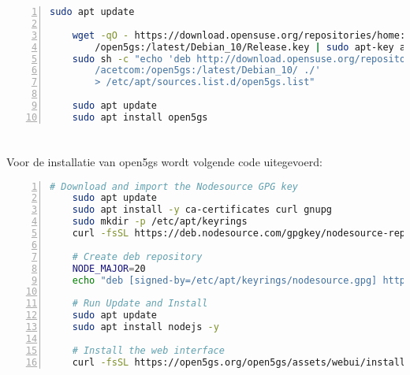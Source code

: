 
\begin{lstlisting}[basicstyle=\small, frame=single, breaklines=true, postbreak=\mbox{\textcolor{red}{$\hookrightarrow$}\space}, escapeinside ={\%,}, escapechar={!}, numbers=left, language=sh, caption=Installatie van Open5GS]
    sudo apt update

    wget -qO - https://download.opensuse.org/repositories/home:/acetcom:
        /open5gs:/latest/Debian_10/Release.key | sudo apt-key add -
    sudo sh -c "echo 'deb http://download.opensuse.org/repositories/home:
        /acetcom:/open5gs:/latest/Debian_10/ ./' 
        > /etc/apt/sources.list.d/open5gs.list"
    
    sudo apt update
    sudo apt install open5gs
\end{lstlisting}

\section{}

Voor de installatie van \gls{open5gs} wordt volgende code uitegevoerd:

\begin{lstlisting}[basicstyle=\small, frame=single, breaklines=true, postbreak=\mbox{\textcolor{red}{$\hookrightarrow$}\space}, escapeinside ={\%,}, escapechar={!}, numbers=left, language=sh, caption=Installatie van web-interface]
    # Download and import the Nodesource GPG key
    sudo apt update
    sudo apt install -y ca-certificates curl gnupg
    sudo mkdir -p /etc/apt/keyrings
    curl -fsSL https://deb.nodesource.com/gpgkey/nodesource-repo.gpg.key | sudo gpg --dearmor -o /etc/apt/keyrings/nodesource.gpg
    
    # Create deb repository
    NODE_MAJOR=20
    echo "deb [signed-by=/etc/apt/keyrings/nodesource.gpg] https://deb.nodesource.com/node_$NODE_MAJOR.x nodistro main" | sudo tee /etc/apt/sources.list.d/nodesource.list
    
    # Run Update and Install
    sudo apt update
    sudo apt install nodejs -y

    # Install the web interface
    curl -fsSL https://open5gs.org/open5gs/assets/webui/install | sudo -E bash -
\end{lstlisting}


